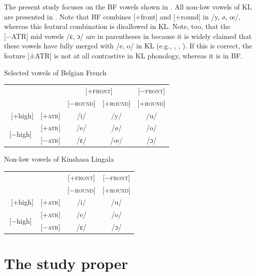 \documentclass[output=paper]{langscibook}
\begin{document}
The present study focuses on the BF vowels shown in . All non-low vowels of KL are presented in . Note that BF combines [+front] and [+round] in /y, ø, œ/, whereas this featural combination is disallowed in KL. Note, too, that the [−ATR] mid vowels /ɛ, ɔ/ are in parentheses in  because it is widely claimed that these vowels have fully merged with /e, o/ in KL (e.g., \citealt[20]{motingea2006}, \citealt[303]{bokamba2012polylectal},  \citealt[965]{campbell2013compendium}). If this is correct, the feature [±ATR] is not at all contrastive in KL phonology, whereas it is in BF.

\begin{exe}
\ex \label{ex:kabasele:1}
\begin{xlist}

\ex Selected vowels of Belgian French\label{ex:kabasele:1a}\\
\begin{tabular}{ccccc}
     &  & \multicolumn{2}{c}{[+\textsc{front}]} & [−\textsc{front}]\\
     &  & [−\textsc{round}] & [+\textsc{round}] & [+\textsc{round}] \\
 \ [+high] & [+\textsc{atr}] & /i/ & /y/ & /u/ \\[6pt]
  \multirow{2}{*}{[−high]} & [+\textsc{atr}] & /e/ & /ø/ & /o/ \\
  & [−\textsc{atr}] & /ɛ/ & /œ/ &  /ɔ/ \\[12pt]
\end{tabular}

\ex Non-low vowels of Kinshasa Lingala\label{ex:kabasele:1b}\\
\begin{tabular}{cccc}
  &    &  [+\textsc{front}] & [−\textsc{front}] \\
  &  & [−\textsc{round}] & [+\textsc{round}]\\
 \ [+high] & [+\textsc{atr}]    & /i/ & /u/ \\[6pt]
 \multirow{2}{*}{[−high]} & [+\textsc{atr}] & /e/ & /o/ \\
  & [−\textsc{atr}] & /ɛ/ & /ɔ/ \\
\end{tabular}

\end{xlist}
\end{exe}

\section{The study proper}
\end{document}
